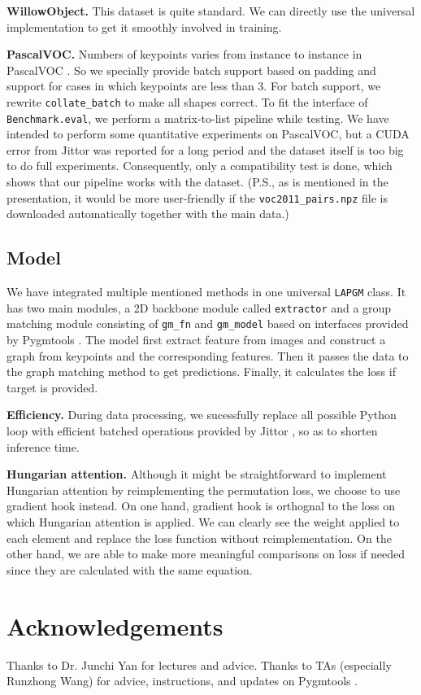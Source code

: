 \documentclass[a4paper]{article}
\begin{document}
\textbf{WillowObject.}
This dataset is quite standard. We can directly use the universal implementation to get it smoothly involved in training.

\textbf{PascalVOC.}
Numbers of keypoints varies from instance to instance in PascalVOC \cite{voc1,voc2}. So we specially provide batch support based on padding and support for cases in which keypoints are less than $3$. For batch support, we rewrite \texttt{collate\_batch} to make all shapes correct. To fit the interface of \texttt{Benchmark.eval}, we perform a matrix-to-list pipeline while testing. We have intended to perform some quantitative experiments on PascalVOC, but a CUDA error from Jittor \cite{jittor} was reported for a long period and the dataset itself is too big to do full experiments. Consequently, only a compatibility test is done, which shows that our pipeline works with the dataset. (P.S., as is mentioned in the presentation, it would be more user-friendly if the \texttt{voc2011\_pairs.npz} file is downloaded automatically together with the main data.) 

\subsection{Model}
We have integrated multiple mentioned methods in one universal \texttt{LAPGM} class. It has two main modules, a 2D backbone module called \texttt{extractor} and a group matching module consisting of \texttt{gm\_fn} and \texttt{gm\_model} based on interfaces provided by Pygmtools \cite{pygmtools}. The model first extract feature from images and construct a graph from keypoints and the corresponding features. Then it passes the data to the graph matching method to get predictions. Finally, it calculates the loss if target is provided.

\textbf{Efficiency.}
During data processing, we sucessfully replace all possible Python loop with efficient batched operations provided by Jittor \cite{jittor}, so as to shorten inference time.

\textbf{Hungarian attention.}
Although it might be straightforward to implement Hungarian attention by reimplementing the permutation loss, we choose to use gradient hook instead. On one hand, gradient hook is orthognal to the loss on which Hungarian attention is applied. We can clearly see the weight applied to each element and replace the loss function without reimplementation. On the other hand, we are able to make more meaningful comparisons on loss if needed since they are calculated with the same equation.

\section{Acknowledgements}
Thanks to Dr. Junchi Yan for lectures and advice. Thanks to TAs (especially Runzhong Wang) for advice, instructions, and updates on Pygmtools \cite{pygmtools}.

\newpage 


\end{document}
